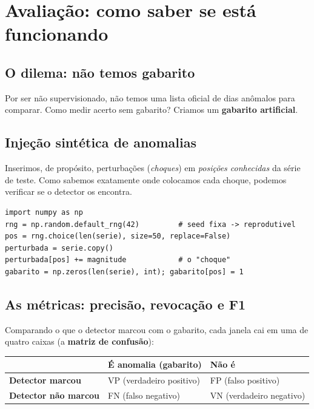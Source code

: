 \section{Avaliação: como saber se está funcionando}
\label{sec:avaliacao}

\subsection{O dilema: não temos gabarito}
Por ser não supervisionado, não temos uma lista oficial de dias anômalos para
comparar. Como medir acerto sem gabarito? Criamos um \textbf{gabarito artificial}.

\subsection{Injeção sintética de anomalias}
\begin{definicao}
Inserimos, de propósito, perturbações (\emph{choques}) em \emph{posições
conhecidas} da série de teste. Como sabemos exatamente onde colocamos cada
choque, podemos verificar se o detector os encontra.
\end{definicao}

\begin{lstlisting}[caption={Injetar choques em posições aleatórias (gera o gabarito).}]
import numpy as np
rng = np.random.default_rng(42)         # seed fixa -> reprodutivel
pos = rng.choice(len(serie), size=50, replace=False)
perturbada = serie.copy()
perturbada[pos] += magnitude            # o "choque"
gabarito = np.zeros(len(serie), int); gabarito[pos] = 1
\end{lstlisting}

\subsection{As métricas: precisão, revocação e F1}
Comparando o que o detector marcou com o gabarito, cada janela cai em uma de
quatro caixas (a \textbf{matriz de confusão}):

\begin{center}
\begin{tabular}{lll}
\toprule
 & \textbf{É anomalia (gabarito)} & \textbf{Não é} \\
\midrule
\textbf{Detector marcou}    & VP (verdadeiro positivo) & FP (falso positivo) \\
\textbf{Detector não marcou}& FN (falso negativo)      & VN (verdadeiro negativo) \\
\bottomrule
\end{tabular}
\end{center}


